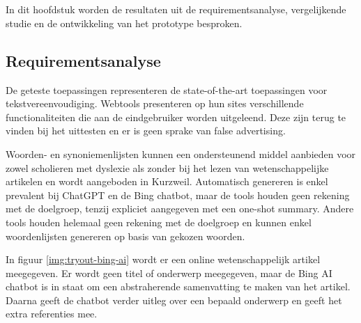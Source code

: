 
\chapter{}%
\label{ch:discussie}

In dit hoofdstuk worden de resultaten uit de requirementsanalyse, vergelijkende studie en de ontwikkeling van het prototype besproken. 

\section{Requirementsanalyse}


De geteste toepassingen representeren de state-of-the-art toepassingen voor tekstvereenvoudiging. Webtools presenteren op hun sites verschillende functionaliteiten die aan de eindgebruiker worden uitgeleend. Deze zijn terug te vinden bij het uittesten en er is geen sprake van false advertising. 


Woorden- en synoniemenlijsten kunnen een ondersteunend middel aanbieden voor zowel scholieren met dyslexie als zonder bij het lezen van wetenschappelijke artikelen en wordt aangeboden in Kurzweil. Automatisch genereren is enkel prevalent bij ChatGPT en de Bing chatbot, maar de tools houden geen rekening met de doelgroep, tenzij expliciet aangegeven met een one-shot summary. Andere tools houden helemaal geen rekening met de doelgroep en kunnen enkel woordenlijsten genereren op basis van gekozen woorden.

\medspace

In figuur \ref{img:tryout-bing-ai} wordt er een online wetenschappelijk artikel meegegeven. Er wordt geen titel of onderwerp meegegeven, maar de Bing AI chatbot is in staat om een abstraherende samenvatting te maken van het artikel. Daarna geeft de chatbot verder uitleg over een bepaald onderwerp en geeft het extra referenties mee.


